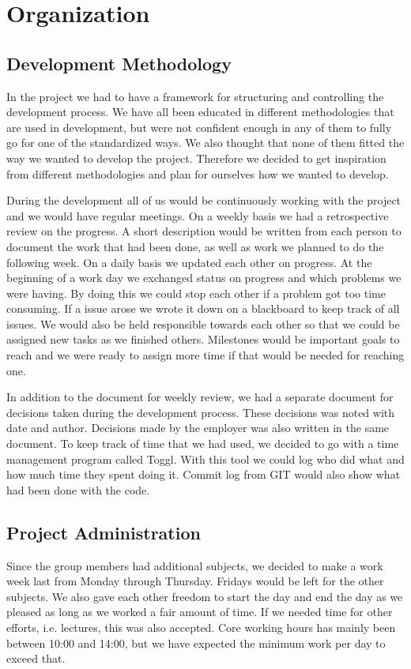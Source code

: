 \section{Organization}
\label{sec:organization}

\subsection{Development Methodology}
\label{subsec:development_methodology}
In the project we had to have a framework for structuring and controlling the
development process. We have all been educated in different methodologies that
are used in development, but were not confident enough in any of them to fully
go for one of the standardized ways. We also thought that none of them fitted 
the way we wanted to develop the project. Therefore we decided to get inspiration
from different methodologies and plan for ourselves how we wanted to develop.

During the development all of us would be continuously working with the project and we would have
regular meetings. On a weekly basis we had a retrospective review on
the progress. A short description would be written from each person to
document the work that had been done, as well as work we planned to do the
following week. On a daily basis we updated each other on progress. At
the beginning of a work day we exchanged status on progress and which
problems we were having. By doing this we could stop each other if a problem
got too time consuming. If a issue arose we wrote it down on a blackboard to keep track of all issues.
We would also be held responsible towards each other so
that we could be assigned new tasks as we finished others. Milestones would be
important goals to reach and we were ready to assign more time if that
would be needed for reaching one.

In addition to the document for weekly review, we had a separate
document for decisions taken during the development process. These decisions
was noted with date and author. Decisions made by the employer was
also written in the same document. To keep track of time that we had used,
we decided to go with a time management program called Toggl\cite{Toggl}. With this tool we
could log who did what and how much time they spent doing it. Commit log from GIT would
also show what had been done with the code.


\subsection{Project Administration}
\label{subsec:project_administration}
Since the group members had additional subjects, we decided to make a work week
last from Monday through Thursday. Fridays would be left for the other
subjects. We also gave each other freedom to start the day and end the day as
we pleased as long as we worked a fair amount of time. If we needed time for
other efforts, i.e. lectures, this was also accepted. Core working hours has
mainly been between 10:00 and 14:00, but we have expected the minimum work per
day to exceed that.

